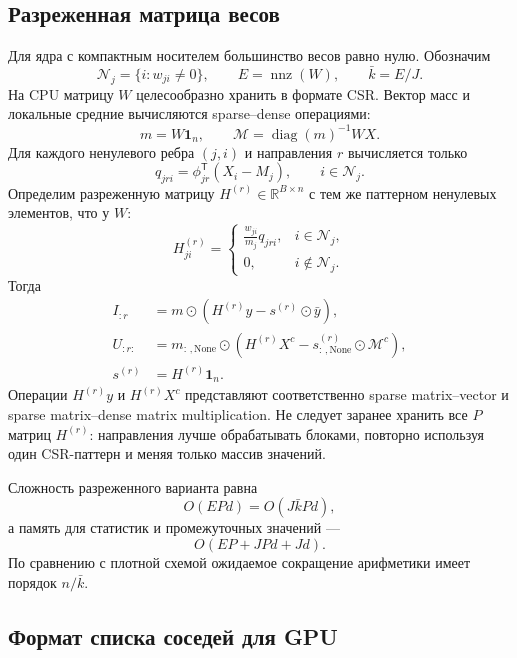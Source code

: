 \subsection{Разреженная матрица весов}

Для ядра с компактным носителем большинство весов равно нулю.
Обозначим
\[
\mathcal N_j=\{i:w_{ji}\neq0\},
\qquad
E=\operatorname{nnz}(W),
\qquad
\bar k=E/J.
\]
На CPU матрицу $W$ целесообразно хранить в формате CSR.
Вектор масс и локальные средние вычисляются sparse--dense операциями:
\begin{equation}
m=W\mathbf 1_n,
\qquad
\mathcal M=\operatorname{diag}(m)^{-1}WX.
\label{eq:adp-sparse-mean}
\end{equation}
Для каждого ненулевого ребра $(j,i)$ и направления $r$ вычисляется только
\begin{equation}
q_{jri}=\phi_{jr}^{\mathsf T}(X_i-M_j),
\qquad i\in\mathcal N_j.
\label{eq:adp-sparse-q}
\end{equation}
Определим разреженную матрицу $H^{(r)}\in\mathbb R^{B\times n}$
с тем же паттерном ненулевых элементов, что у $W$:
\begin{equation}
H^{(r)}_{ji}=
\begin{cases}
\displaystyle \frac{w_{ji}}{m_j}q_{jri}, & i\in\mathcal N_j,\\[2mm]
0, & i\notin\mathcal N_j.
\end{cases}
\label{eq:adp-sparse-H}
\end{equation}
Тогда
\begin{align}
I_{:r}
&=
m\odot\left(H^{(r)}y-s^{(r)}\odot\bar y\right),
\label{eq:adp-sparse-I}
\\
U_{:r:}
&=
m_{:\,,\mathrm{None}}\odot
\left(
H^{(r)}X^{c}
-s^{(r)}_{:\,,\mathrm{None}}\odot\mathcal M^{c}
\right),
\label{eq:adp-sparse-U}
\\
s^{(r)}&=H^{(r)}\mathbf 1_n.
\end{align}
Операции $H^{(r)}y$ и $H^{(r)}X^{c}$ представляют соответственно
sparse matrix--vector и sparse matrix--dense matrix multiplication.
Не следует заранее хранить все $P$ матриц $H^{(r)}$: направления лучше
обрабатывать блоками, повторно используя один CSR-паттерн и меняя только массив значений.

Сложность разреженного варианта равна
\[
O(EPd)=O(J\bar kPd),
\]
а память для статистик и промежуточных значений ---
\[
O(EP+JPd+Jd).
\]
По сравнению с плотной схемой ожидаемое сокращение арифметики имеет порядок
$n/\bar k$.

\subsection{Формат списка соседей для GPU}

